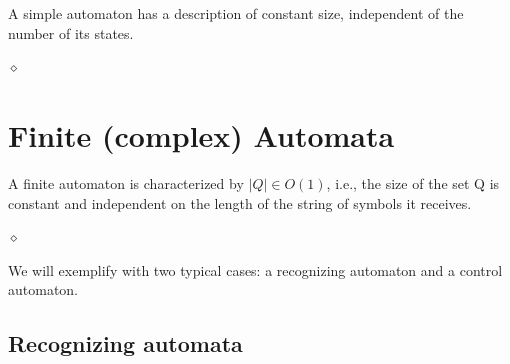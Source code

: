 \begin{definition}
A simple automaton has a description of constant size, independent of the number of its states.

$\diamond$
\end{definition}

\section{Finite (complex) Automata}

\begin{definition}
A finite automaton is characterized by $|Q| \in O(1)$, i.e., the size of the set Q is constant and independent on the length of the string of symbols it receives.

$\diamond$
\end{definition}

We will exemplify with two typical cases: a recognizing automaton and a control automaton.

\subsection{Recognizing automata}

